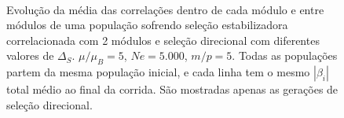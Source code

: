 \begin{figure}[htbp]
   \vspace{-18pt}
   \vspace{11pt}
   \\
   \caption{ Evolução da média das correlações dentro de cada módulo
      e entre módulos de uma população sofrendo seleção estabilizadora
      correlacionada com 2 módulos e seleção direcional com diferentes
   valores de $\Delta_S$. $\mu/\mu_B = 5$, $Ne = 5.000$, $m/p=5$. 
   Todas as populações partem da mesma população inicial, e cada linha
   tem o mesmo $|\beta_i|$ total médio ao final da corrida. São mostradas apenas
   as gerações de seleção direcional.}
   \label{MFMxSS}
\end{figure}

